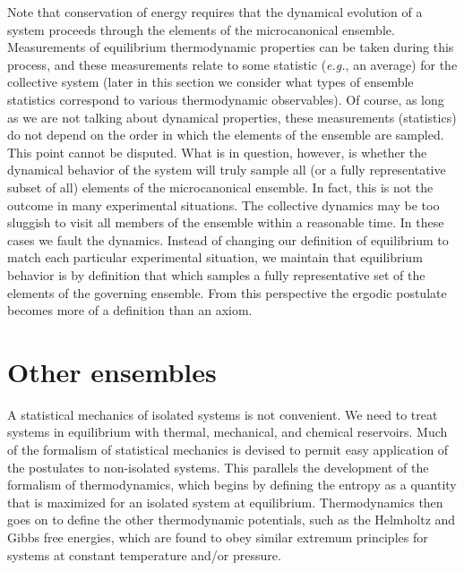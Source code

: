 \documentclass[9pt,bestpractices]{molsim}
\begin{document}
Note that conservation of energy requires that the dynamical evolution
of a system proceeds through the elements of the microcanonical
ensemble. Measurements of equilibrium thermodynamic properties can be
taken during this process, and these measurements relate to some
statistic (\emph{e.g.}, an average) for the collective system (later in
this section we consider what types of ensemble statistics correspond to
various thermodynamic observables). Of course, as long as we are not
talking about dynamical properties, these measurements (statistics) do
not depend on the order in which the elements of the ensemble are
sampled. This point cannot be disputed. What is in question, however, is
whether the dynamical behavior of the system will truly sample all (or a
fully representative subset of all) elements of the microcanonical
ensemble. In fact, this is not the outcome in many experimental
situations. The collective dynamics may be too sluggish to visit all
members of the ensemble within a reasonable time. In these cases we
fault the dynamics. Instead of changing our definition of equilibrium to
match each particular experimental situation, we maintain that
equilibrium behavior is by definition that which samples a fully
representative set of the elements of the governing ensemble. From this
perspective the ergodic postulate becomes more of a definition than an
axiom.

\section{Other ensembles}\label{other-ensembles}

A statistical mechanics of isolated systems is not convenient. We need
to treat systems in equilibrium with thermal, mechanical, and chemical
reservoirs. Much of the formalism of statistical mechanics is devised to
permit easy application of the postulates to non-isolated systems. This
parallels the development of the formalism of thermodynamics, which
begins by defining the entropy as a quantity that is maximized for an
isolated system at equilibrium. Thermodynamics then goes on to define
the other thermodynamic potentials, such as the Helmholtz and Gibbs free
energies, which are found to obey similar extremum principles for
systems at constant temperature and/or pressure.
\end{document}
